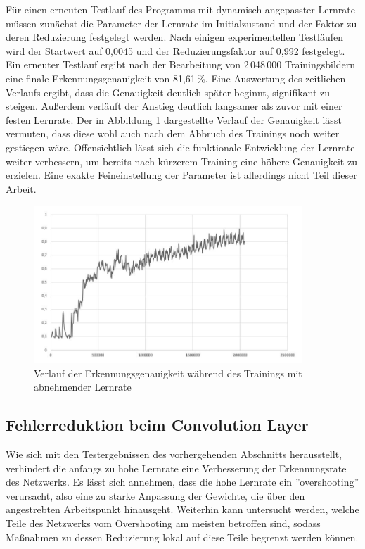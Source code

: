 \documentclass[../main.tex]{subfiles}
\begin{document}
Für einen erneuten Testlauf des Programms mit dynamisch angepasster Lernrate müssen zunächst die Parameter der Lernrate im Initialzustand und der Faktor zu deren Reduzierung festgelegt werden. Nach einigen experimentellen Testläufen wird der Startwert auf 0,0045 und der Reduzierungsfaktor auf 0,992 festgelegt. Ein erneuter Testlauf  ergibt nach der Bearbeitung von 2\,048\,000 Trainingsbildern eine finale Erkennungsgenauigkeit von 81,61\,\%. Eine Auswertung des zeitlichen Verlaufs ergibt, dass die Genauigkeit deutlich später beginnt, signifikant zu steigen. Außerdem verläuft der Anstieg deutlich langsamer als zuvor mit einer festen Lernrate. Der in Abbildung \ref{pic:diagram_lr_decreasing} dargestellte Verlauf der Genauigkeit lässt vermuten, dass diese wohl auch nach dem Abbruch des Trainings noch weiter gestiegen wäre. Offensichtlich lässt sich die funktionale Entwicklung der Lernrate weiter verbessern, um bereits nach kürzerem Training eine höhere Genauigkeit zu erzielen. Eine exakte Feineinstellung der Parameter ist allerdings nicht Teil dieser Arbeit. 
\begin{figure}
	\centering 
	\includegraphics[width=0.9\textwidth]{../images/Schmidt/decreasing_lr.jpg} 
	\caption {Verlauf der Erkennungsgenauigkeit während des Trainings mit abnehmender Lernrate} 
	\label{pic:diagram_lr_decreasing} 
\end{figure} 

\subsection{Fehlerreduktion beim Convolution Layer}
Wie sich  mit den Testergebnissen des vorhergehenden Abschnitts herausstellt, verhindert die anfangs zu hohe Lernrate eine Verbesserung der Erkennungsrate des Netzwerks. Es lässt sich annehmen, dass die hohe Lernrate ein ''overshooting'' verursacht, also eine zu starke Anpassung der Gewichte, die über den angestrebten Arbeitspunkt hinausgeht. Weiterhin kann untersucht werden, welche Teile des Netzwerks vom Overshooting am meisten betroffen sind, sodass Maßnahmen zu dessen Reduzierung lokal auf diese Teile begrenzt werden können. 
\end{document}
